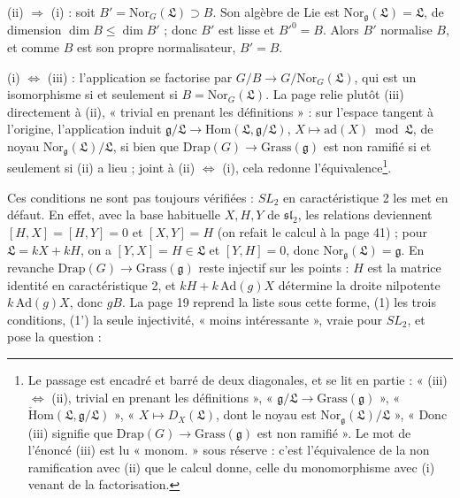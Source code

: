 \documentclass[11pt,a4paper]{article}
\begin{document}
(ii) $\Rightarrow$ (i) : soit $B' = \mathrm{Nor}_G(\mathfrak{L}) \supset B$. Son
algèbre de Lie est $\mathrm{Nor}_{\mathfrak{g}}(\mathfrak{L}) = \mathfrak{L}$, de
dimension $\dim B \leq \dim B'$ ; donc $B'$ est lisse et $B'^0 = B$. Alors $B'$
normalise $B$, et comme $B$ est son propre normalisateur, $B' = B$.

(i) $\Leftrightarrow$ (iii) : l'application se factorise par
$G/B \to G/\mathrm{Nor}_G(\mathfrak{L})$, qui est un isomorphisme si et seulement
si $B = \mathrm{Nor}_G(\mathfrak{L})$. La page relie plutôt (iii) directement à
(ii), « trivial en prenant les définitions » : sur l'espace tangent à l'origine,
l'application induit $\mathfrak{g}/\mathfrak{L} \to \mathrm{Hom}(\mathfrak{L},
\mathfrak{g}/\mathfrak{L})$, $X \mapsto \mathrm{ad}(X) \bmod \mathfrak{L}$, de
noyau $\mathrm{Nor}_{\mathfrak{g}}(\mathfrak{L})/\mathfrak{L}$, si bien que
$\mathrm{Drap}(G) \to \mathrm{Grass}(\mathfrak{g})$ est non ramifié si et
seulement si (ii) a lieu ; joint à (ii) $\Leftrightarrow$ (i), cela redonne
l'équivalence\footnote{Le passage est encadré et barré de deux diagonales, et se
lit en partie : « (iii) $\iff$ (ii), trivial en prenant les définitions »,
« $\mathfrak{g}/\mathfrak{L} \to \mathrm{Grass}(\mathfrak{g})$ »,
« $\check{\mathrm{H}}\mathrm{om}(\mathfrak{L}, \mathfrak{g}/\mathfrak{L})$ »,
« $X \mapsto D_X(\mathfrak{L})$, dont le noyau est
$\mathrm{Nor}_{\mathfrak{g}}(\mathfrak{L})/\mathfrak{L}$ », « Donc (iii) signifie
que $\mathrm{Drap}(G) \to \mathrm{Grass}(\mathfrak{g})$ est non ramifié ». Le mot
de l'énoncé (iii) est lu « monom. » sous réserve : c'est l'équivalence de la non
ramification avec (ii) que le calcul donne, celle du monomorphisme avec (i)
venant de la factorisation.}.

Ces conditions ne sont pas toujours vérifiées : $SL_2$ en caractéristique 2 les
met en défaut. En effet, avec la base habituelle $X, H, Y$ de $\mathfrak{sl}_2$,
les relations deviennent $[H,X] = [H,Y] = 0$ et $[X,Y] = H$ (on refait le calcul
à la page 41) ; pour $\mathfrak{L} = kX + kH$, on a $[Y,X] = H \in \mathfrak{L}$ et
$[Y,H] = 0$, donc $\mathrm{Nor}_{\mathfrak{g}}(\mathfrak{L}) = \mathfrak{g}$. En
revanche $\mathrm{Drap}(G) \to \mathrm{Grass}(\mathfrak{g})$ reste injectif sur
les points : $H$ est la matrice identité en caractéristique 2, et $kH +
k\,\mathrm{Ad}(g)X$ détermine la droite nilpotente $k\,\mathrm{Ad}(g)X$, donc
$gB$. La page 19 reprend la liste sous cette forme, (1) les trois conditions,
(1') la seule injectivité, « moins intéressante », vraie pour $SL_2$, et pose la
question :
\end{document}
